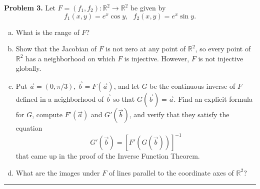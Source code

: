\documentclass[leqno]{article}
\theoremstyle{nonumberplain}
\newcommand{\R}{\mathbb{R}}
\begin{document}
\noindent\textbf{Problem 3.} Let $F=(f_1,f_2)\colon \R^2 \to \R^2$ be given by 
\[
f_1(x,y)=e^x \cos y,~~~ f_2(x,y)=e^x \sin y.
\]
\begin{enumerate}[(a)]
\item What is the range of $F$?
\item Show that the Jacobian of $F$ is not zero at any point of $\R^2$, so every point of $\R^2$ has a neighborhood on which $F$ is injective. However, $F$ is not injective globally.
\item Put $\vec{a}=(0,\pi/3)$, $\vec{b}=F(\vec{a})$, and let $G$ be the continuous inverse of $F$ defined in a neighborhood of $\vec{b}$ so that $G(\vec{b})=\vec{a}$. Find an explicit formula for $G$, compute $F'(\vec{a})$ and $G'(\vec{b})$, and verify that they satisfy the equation
\[
G'(\vec{b})=\left[F'(G(\vec{b}))\right]^{-1}
\]
that came up in the proof of the Inverse Function Theorem.
\item What are the images under $F$ of lines parallel to the coordinate axes of $\R^2$?
\end{enumerate}

\noindent\rule[0.5ex]{\linewidth}{1pt}
\end{document}
